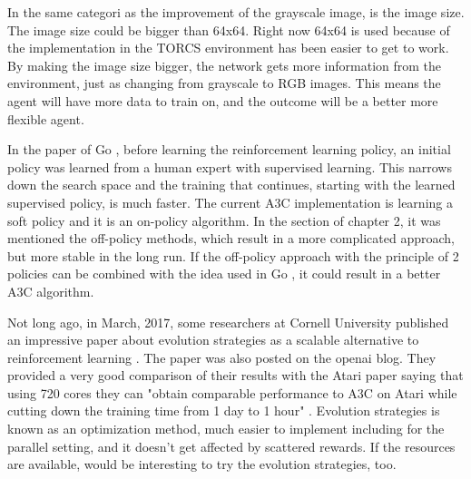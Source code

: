 In the same categori as the improvement of the grayscale image, is the image size. The image size could be bigger than 64x64. Right now 64x64 is used because of the implementation in the TORCS environment has been easier to get to work. By making the image size bigger, the network gets more information from the environment, just as changing from grayscale to RGB images. This means the agent will have more data to train on, and the outcome will be a better more flexible agent. 

In the paper of Go \cite{Silver_2016}, before learning the reinforcement learning policy, an initial policy was learned from a human expert with supervised learning. This narrows down the search space and the training that continues, starting with the learned supervised policy, is much faster. The current A3C implementation is learning a soft policy and it is an on-policy algorithm. In the  section of chapter 2, it was mentioned the off-policy methods, which result in a more complicated approach, but more stable in the long run. If the off-policy approach with the principle of 2 policies can be combined with the idea used in Go \cite{Silver_2016}, it could result in a better A3C algorithm.

Not long ago, in March, 2017, some researchers at Cornell University published an impressive paper about evolution strategies as a scalable alternative to reinforcement learning \cite{EvolStrat}. The paper was also posted on the openai blog. They provided a very good comparison of their results with the Atari paper \cite{DBLP:journals/corr/MnihKSGAWR13} saying that using 720 cores they can "obtain comparable performance to A3C on Atari while cutting down the training time from 1 day to 1 hour" \cite{EvolStrat}. Evolution strategies is known as an optimization method, much easier to implement including for the parallel setting, and it doesn't get affected by scattered rewards. If the resources are available, would be interesting to try the evolution strategies, too.